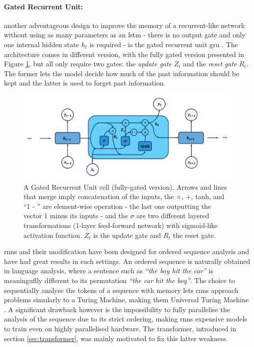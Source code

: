 \paragraph{Gated Recurrent Unit:} another adventageous design to improve the memory of a recurrent-like network without using as many parameters as an \gls{lstm} - there is no output gate and only one internal hidden state $h_t$ is required - is the gated recurrent unit \gls{gru} \cite{gruPaper}. The architecture comes in different version, with the fully gated version presented in Figure \ref{fig:gruCell}, but all only require two gates: the \textit{update gate} $Z_t$ and the \textit{reset gate} $R_t$. The former lets the model decide how much of the past information should be kept and the latter is used to forget past information.

\begin{figure}[h!]
    \center
    \includegraphics[scale=0.5]{Images/ML/gru.png}
    \caption{A Gated Recurrent Unit cell (fully-gated version). Arrows and lines that merge imply concatenation of the inputs, the $\times$, $+$, tanh, and ``1 - '' are element-wise operation - the last one outputting the vector 1 minus its inputs - and the $\sigma$ are two different layered transformations (1-layer feed-forward network) with sigmoid-like activation function. $Z_t$ is the update gate and $R_t$ the reset gate. } 
    \label{fig:gruCell}
\end{figure}

\gls{rnn}s and their modification have been designed for ordered sequence analysis and have had great results in such settings. An ordered sequence is naturally obtained in language analysis, where a sentence such as \textit{``the boy hit the car''} is meaninguflly different to its permutation \textit{``the car hit the boy''}. The choice to sequentially analyse the tokens of a sequence with memory lets \gls{rnn}s approach problems simularly to a Turing Machine, making them Universal Turing Machine \cite{NEURIPS2021_ef452c63}. A significant drawback however is the impossibility to fully parallelise the analysis of the sequence due to its strict ordering, making \gls{rnn}s expensive models to train even on highly parallelised hardware. The transformer, introduced in section \ref{sec:transformer}, was mainly motivated to fix this latter weakness. \\

